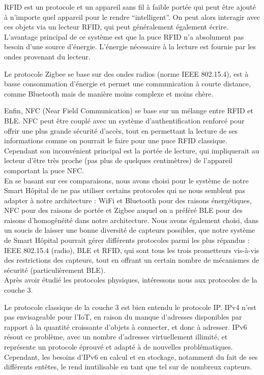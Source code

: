 \documentclass{article}
\begin{document}
RFID est un protocole et un appareil sans fil à faible portée qui peut être ajouté à n’importe quel appareil pour le rendre “intelligent”. On peut alors interagir avec ces objets via un lecteur RFID, qui peut généralement également écrire. L’avantage principal de ce système est que la puce RFID n’a absolument pas besoin d’une source d’énergie. L’énergie nécessaire à la lecture est fournie par les ondes provenant du lecteur.

Le protocole Zigbee se base sur des ondes radios (norme IEEE 802.15.4), est à basse consommation d’énergie et permet une communication à courte distance, comme Bluetooth mais de manière moins complexe et moins chère.

Enfin, NFC (Near Field Communication) \cite{NFC} se base sur un mélange entre RFID et BLE. NFC peut être couplé avec un système d’authentification renforcé pour offrir une plus grande sécurité d’accès, tout en permettant la lecture de ses informations comme on pourrait le faire pour une puce RFID classique. Cependant son inconvénient principal est la portée de lecture, qui impliquerait au lecteur d'être très proche (pas plus de quelques centimètres) de l’appareil comportant la puce NFC.
\\

En se basant sur ces comparaisons, nous avons choisi pour le système de notre Smart Hôpital de ne pas utiliser certains protocoles qui ne nous semblent pas adapter à notre architecture : WiFi et Bluetooth pour des raisons énergétiques, NFC pour des raisons de portée et Zigbee auquel on a préféré BLE pour des raisons d'homogénéité dans notre architecture. Nous avons également choisi, dans un soucis de laisser une bonne diversité de capteurs possibles, que notre système de Smart Hôpital pourrait gérer différents protocoles parmi les plus répandus : IEEE 802.15.4 (radio), BLE et RFID, qui sont tous les trois prometteurs vis-à-vis des restrictions des capteurs, tout en offrant un certain nombre de mécanismes de sécurité (particulièrement BLE).
\\

Après avoir étudié les protocoles physiques, intéressons nous aux protocoles de la couche 3.

Le protocole classique de la couche 3 est bien entendu le protocole IP. IPv4 n’est pas envisageable pour l’IoT, en raison du manque d’adresses disponibles par rapport à la quantité croissante d’objets à connecter, et donc à adresser. IPv6 \cite{jara2013internet} résout ce problème, avec un nombre d’adresses virtuellement illimité, et représente un protocole éprouvé et adapté à de nouvelles problématiques. Cependant, les besoins d’IPv6 en calcul et en stockage, notamment du fait de ses différents entêtes, le rend inutilisable en tant que tel sur de nombreux capteurs.
\end{document}
